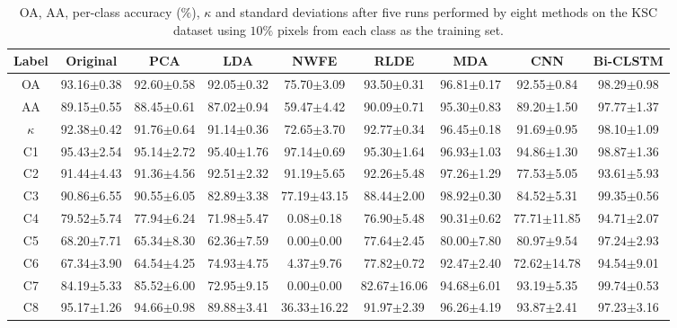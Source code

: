 \documentclass[12pt,onecolumn]{IEEEtran}
\begin{document}
\begin{spacing}{2}
\begin{table}\scriptsize
\centering
\caption{OA, AA, per-class accuracy ($\%$), $\kappa$ and standard deviations after five runs performed by eight methods on the KSC dataset using $10\%$ pixels from each class as the training set.}
\label{KSC_r}
\begin{tabular}{|c|c|c|c|c|c|c|c|c|}
\hline
Label & Original        & PCA             & LDA             & NWFE            & RLDE            & MDA             & CNN             & Bi-CLSTM       \\ \hline
OA    & 93.16$\pm$0.38  & 92.60$\pm$0.58  & 92.05$\pm$0.32  & 75.70$\pm$3.09  & 93.50$\pm$0.31 & 96.81$\pm$0.17  & 92.55$\pm$0.84  & 98.29$\pm$0.98  \\ \hline
AA    & 89.15$\pm$0.55  & 88.45$\pm$0.61  & 87.02$\pm$0.94  & 59.47$\pm$4.42  & 90.09$\pm$0.71 & 95.30$\pm$0.83  & 89.20$\pm$1.50  & 97.77$\pm$1.37  \\ \hline
$\kappa$& 92.38$\pm$0.42 & 91.76$\pm$0.64 & 91.14$\pm$0.36  & 72.65$\pm$3.70  & 92.77$\pm$0.34 & 96.45$\pm$0.18  & 91.69$\pm$0.95  & 98.10$\pm$1.09\\ \hline
C1    & 95.43$\pm$2.54 & 95.14$\pm$2.72  & 95.40$\pm$1.76 & 97.14$\pm$0.69    & 95.30$\pm$1.64 & 96.93$\pm$1.03  & 94.86$\pm$1.30 & 98.87$\pm$1.36  \\ \hline
C2    & 91.44$\pm$4.43 & 91.36$\pm$4.56 & 92.51$\pm$2.32  & 91.19$\pm$5.65    & 92.26$\pm$5.48 & 97.26$\pm$1.29  & 77.53$\pm$5.05  & 93.61$\pm$5.93 \\ \hline
C3    & 90.86$\pm$6.55 & 90.55$\pm$6.05 & 82.89$\pm$3.38 & 77.19$\pm$43.15    & 88.44$\pm$2.00 & 98.92$\pm$0.30  & 84.52$\pm$5.31  & 99.35$\pm$0.56 \\ \hline
C4    & 79.52$\pm$5.74 & 77.94$\pm$6.24 & 71.98$\pm$5.47 & 0.08$\pm$0.18     & 76.90$\pm$5.48  & 90.31$\pm$0.62  & 77.71$\pm$11.85 & 94.71$\pm$2.07  \\ \hline
C5    & 68.20$\pm$7.71 & 65.34$\pm$8.30 & 62.36$\pm$7.59  & 0.00$\pm$0.00    & 77.64$\pm$2.45  & 80.00$\pm$7.80  & 80.97$\pm$9.54  & 97.24$\pm$2.93 \\ \hline
C6    & 67.34$\pm$3.90 & 64.54$\pm$4.25 & 74.93$\pm$4.75 & 4.37$\pm$9.76     & 77.82$\pm$0.72  & 92.47$\pm$2.40  & 72.62$\pm$14.78  & 94.54$\pm$9.01 \\ \hline
C7    & 84.19$\pm$5.33  & 85.52$\pm$6.00 & 72.95$\pm$9.15 & 0.00$\pm$0.00    & 82.67$\pm$16.06 & 94.68$\pm$6.01  & 93.19$\pm$5.35 & 99.74$\pm$0.53 \\ \hline
C8    & 95.17$\pm$1.26 & 94.66$\pm$0.98 & 89.88$\pm$3.41  & 36.33$\pm$16.22  & 91.97$\pm$2.39  & 96.26$\pm$4.19  & 93.87$\pm$2.41 & 97.23$\pm$3.16\\ \hline

\end{tabular}
\end{table}
\end{spacing}
\end{document}
